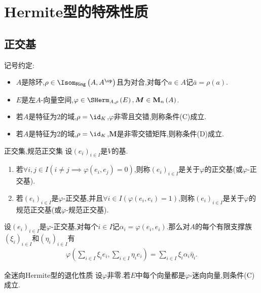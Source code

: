 \chapter{Hermite型的特殊性质}

\section{正交基}

记号约定:
\begin{itemize}
	\item $A$是除环,$\rho\in\Isom_{\mathsf{Ring}}\left(A,A^{\op}\right)$且为对合,对每个$a\in A$记$\bar{a}=\rho\left(a\right)$.
	\item $E$是左$A$-向量空间,$\varphi\in\SHerm_{A,\rho}\left(E\right),\boldsymbol{M}\in\mathbf{M}_{n}\left(A\right)$.
	\item 若$A$是特征为$2$的域,$\rho=\id_{K}$,$\varphi$非零且交错,则称条件(C)成立.
	\item 若$A$是特征为$2$的域,$\rho=\id_{K}$,$\boldsymbol{M}$是非零交错矩阵,则称条件(D)成立.
\end{itemize}

\begin{definition}{正交集,规范正交集}{}
	设$\left(e_{i}\right)_{i\in I}$是$V$的基.
	\begin{enumerate}
		\item 若$\forall i,j\in I\left(i\neq j\implies\varphi\left(e_{i},e_{j}\right)=0\right)$,则称$\left(e_{i}\right)_{i\in I}$是关于$\varphi$的正交基(或$\varphi$-正交基).
		\item 若$\left(e_{i}\right)_{i\in I}$是$\varphi$-正交基,并且$\forall i\in I\left(\varphi\left(e_{i},e_{i}\right)=1\right)$,则称$\left(e_{i}\right)_{i\in I}$是关于$\varphi$的规范正交基(或$\varphi$-规范正交基).
	\end{enumerate}
\end{definition}

\begin{remark}{}{}
	设$\left(e_{i}\right)_{i\in I}$是$\varphi$-正交基,对每个$i\in I$记$\alpha_{i}=\varphi\left(e_{i},e_{i}\right)$.那么对$A$的每个有限支撑族$\left(\xi_{i}\right)_{i\in I}$和$\left(\eta_{i}\right)_{i\in I}$有
	\begin{align*}
		\varphi\left(\sum\limits_{i\in I}\xi_{i}e_{i},\sum_{i\in I}\eta_{i}e_{i}\right)=\sum\limits_{i\in I}\xi_{i}\alpha_{i}\bar{\eta}_{i}.
	\end{align*}
\end{remark}

\begin{lemma}{全迷向Hermite型的退化性质}{}
	设$\varphi$非零.若$E$中每个向量都是$\varphi$-迷向向量,则条件(C)成立.
\end{lemma}

